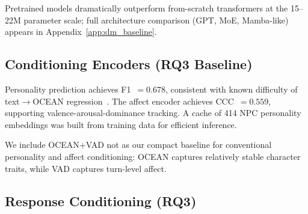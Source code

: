 \documentclass[11pt]{article}
\begin{document}
Pretrained models dramatically outperform from-scratch transformers at the 15--22M parameter scale; full architecture comparison (GPT, MoE, Mamba-like) appears in Appendix~\ref{app:slm_baseline}.

\subsection{Conditioning Encoders (RQ3 Baseline)}

\begin{table}[t]
\centering
\caption{Conditioning encoder evaluation.}
\label{tab:encoders}
\small
{}
\end{table}

Personality prediction achieves F1~$=0.678$, consistent with known difficulty of text$\to$OCEAN regression~\cite{mairesse2007using}.
The affect encoder achieves CCC~$=0.559$, supporting valence-arousal-dominance tracking.
A cache of 414 NPC personality embeddings was built from training data for efficient inference.

We include OCEAN+VAD not as our compact baseline for conventional personality and affect conditioning: OCEAN captures relatively stable character traits, while VAD captures turn-level affect.

\subsection{Response Conditioning (RQ3)}
\end{document}
